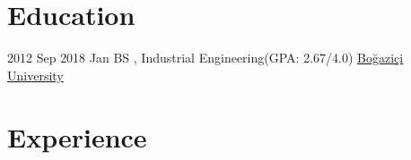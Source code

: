 \documentclass[letterpaper]{DS_class_file} %
\begin{document}
\makeprofile %

\section{Education}

\begin{twenty} %
   	\twentyitem
	    {2012 Sep}
	    {2018 Jan}
	    {\hspace{0.2cm}BS , Industrial Engineering\textnormal{(GPA: 2.67/4.0)}}
	    {\href{http://www.ie.boun.edu.tr/}{\hspace{0.27cm}Boğaziçi University}}
	    {}
	    {} 
\end{twenty}


\section{Experience}
\end{document}
